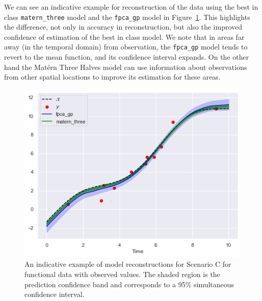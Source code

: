 We can see an indicative example for reconstruction of the data using the best in class \verb*|matern_three| model and the \verb*|fpca_gp| model in Figure~\ref{fig:sim_val_recon_C}.
This highlights the difference, not only in accuracy in reconstruction, but also the improved confidence of estimation of the best in class model.
We note that in areas far away (in the temporal domain) from observation, the \verb*|fpca_gp| model tends to revert to the mean function, and its confidence interval expands.
On the other hand the Mat\'ern Three Halves model can use information about observations from other spatial locations to improve its estimation for these areas.

\begin{figure}
	\centering
	\includegraphics[width=\textwidth]{sim_val_recon_C}
	\caption[An indicative example of model reconstructions  for Scenario C for functional data with observed values.]{An indicative example of model reconstructions  for Scenario C for functional data with observed values. The shaded region is the prediction confidence band and corresponds to a 95\% simultaneous confidence interval.}
	\label{fig:sim_val_recon_C}
\end{figure}

